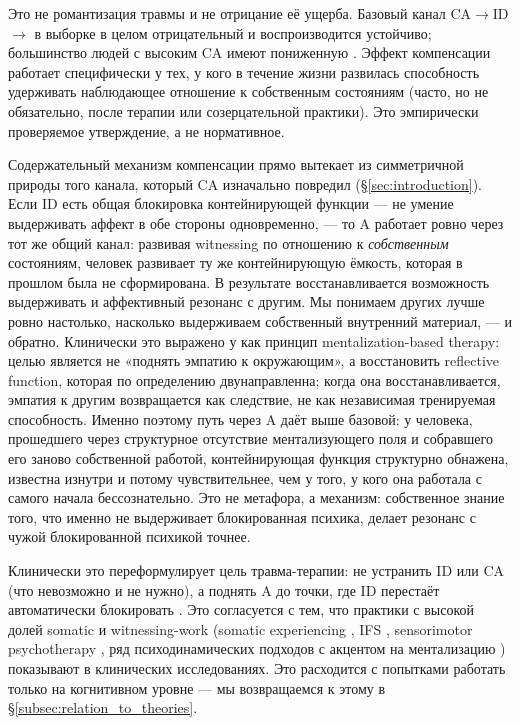 Это не романтизация травмы и не отрицание её ущерба. Базовый канал CA$\to$ID$\to$\EAF{} в выборке в целом отрицательный и воспроизводится устойчиво; большинство людей с высоким CA имеют пониженную \EAF{}. Эффект компенсации работает специфически у тех, у кого в течение жизни развилась способность удерживать наблюдающее отношение к собственным состояниям (часто, но не обязательно, после терапии или созерцательной практики). Это эмпирически проверяемое утверждение, а не нормативное.

Содержательный механизм компенсации прямо вытекает из симметричной природы того канала, который CA изначально повредил (§\ref{sec:introduction}). Если ID есть общая блокировка контейнирующей функции --- не умение выдерживать аффект в обе стороны одновременно, --- то A работает ровно через тот же общий канал: развивая witnessing по отношению к \emph{собственным} состояниям, человек развивает ту же контейнирующую ёмкость, которая в прошлом была не сформирована. В результате восстанавливается возможность выдерживать и аффективный резонанс с другим. Мы понимаем других лучше ровно настолько, насколько выдерживаем собственный внутренний материал, --- и обратно. Клинически это выражено у \citet{fonagy2002} как принцип mentalization-based therapy: целью является не «поднять эмпатию к окружающим», а восстановить reflective function, которая по определению двунаправленна; когда она восстанавливается, эмпатия к другим возвращается как следствие, не как независимая тренируемая способность. Именно поэтому путь через A даёт \EAF{} выше базовой: у человека, прошедшего через структурное отсутствие ментализующего поля и собравшего его заново собственной работой, контейнирующая функция структурно обнажена, известна изнутри и потому чувствительнее, чем у того, у кого она работала с самого начала бессознательно. Это не метафора, а механизм: собственное знание того, что именно не выдерживает блокированная психика, делает резонанс с чужой блокированной психикой точнее.

Клинически это переформулирует цель травма-терапии: не устранить ID или CA (что невозможно и не нужно), а поднять A до точки, где ID перестаёт автоматически блокировать \EAF{}. Это согласуется с тем, что практики с высокой долей somatic и witnessing-work (somatic experiencing \citep{levine2015}, IFS \citep{schwartz1995}, sensorimotor psychotherapy \citep{ogden2006}, ряд психодинамических подходов с акцентом на ментализацию \citep{fonagy2008}) показывают в клинических исследованиях. Это расходится с попытками работать только на когнитивном уровне --- мы возвращаемся к этому в §\ref{subsec:relation_to_theories}.

